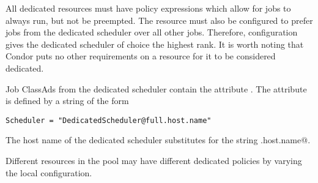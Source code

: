 All dedicated resources must have policy expressions which allow for
jobs to always run, but not be preempted.
The resource must also be configured to prefer jobs from the dedicated 
scheduler over all other jobs.
Therefore, configuration gives
the dedicated scheduler of choice the highest rank.
It is worth noting that Condor puts no other requirements on a
resource for it to be considered dedicated.  

Job ClassAds from the dedicated scheduler 
contain the attribute .
The attribute is defined by a string of the form 
\begin{verbatim}
Scheduler = "DedicatedScheduler@full.host.name"
\end{verbatim}
The host name of the dedicated scheduler
substitutes for the string \verb@full.host.name@. 

Different resources in the pool may have different dedicated policies
by varying the local configuration.

